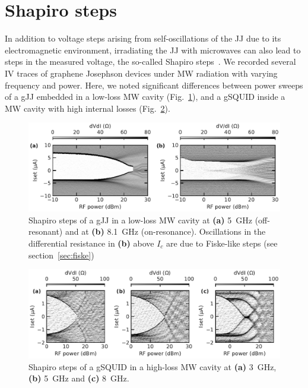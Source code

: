 \section{Shapiro steps}\label{sec:shapiro}

In addition to voltage steps arising from self-oscillations of the JJ due to its electromagnetic environment, irradiating the JJ with microwaves can also lead to steps in the measured voltage, the so-called Shapiro steps~\cite{shapiroJosephsonCurrentsSuperconducting1963,kautzNoiseChaosJosephson1996,tinkhamIntroductionSuperconductivity1996,heerscheBipolarSupercurrentGraphene2007a,leeUltimatelyShortBallistic2015,shellyExistenceShapiroSteps2020,larsonZerobiasCrossingsPeculiar2020}.
%
We recorded several IV traces of graphene Josephson devices under MW radiation with varying frequency and power.
%
Here, we noted significant differences between power sweeps of a gJJ embedded in a low-loss MW cavity (Fig.~\ref{fig:Shapiro2x1}), and a gSQUID inside a MW cavity with high internal losses (Fig.~\ref{fig:ShapiroHero}).

\begin{figure}
	\centering
	\includegraphics[width=\linewidth]{appendix/gJJ-misc-figs/fig_Shapiro2x1}
	\caption{
		Shapiro steps of a gJJ in a low-loss MW cavity at \textbf{(a)} \SI{5}{\giga\hertz} (off-resonant) and at \textbf{(b)} \SI{8.1}{\giga\hertz} (on-resonance).
		Oscillations in the differential resistance in \textbf{(b)} above $I_c$ are due to Fiske-like steps (see section~\ref{sec:fiske})
	}
	\label{fig:Shapiro2x1}
\end{figure}

\begin{figure}
	\centering
	\includegraphics[width=\linewidth]{appendix/gJJ-misc-figs/fig_ShapiroHero}
	\caption{
		Shapiro steps of a gSQUID in a high-loss MW cavity at \textbf{(a)} \SI{3}{\giga\hertz}, \textbf{(b)} \SI{5}{\giga\hertz} and \textbf{(c)} \SI{8}{\giga\hertz}.
	}
	\label{fig:ShapiroHero}
\end{figure}

